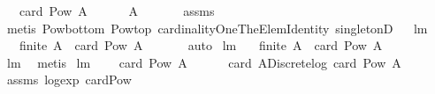 \begin{isabellebody}
\ \ \ {\isachardoublequoteopen}card\ {\isacharparenleft}Pow\ A{\isacharparenright}\ {\isacharequal}\ {}{\isachardoublequoteclose}\ \isanewline
\ \ \ {\isachardoublequoteopen}A\ {\isacharequal}\ {\isacharbraceleft}{\isacharbraceright}{\isachardoublequoteclose}\ \isanewline
%
\isadelimproof
\ \ %
\endisadelimproof
%
\isatagproof
{}\isamarkupfalse%
\ assms\ \isamarkupfalse%
\ {\isacharparenleft}metis\ Pow{\isacharunderscore}bottom\ Pow{\isacharunderscore}top\ cardinalityOneTheElemIdentity\ singletonD{\isacharparenright}%
\endisatagproof
{\isafoldproof}%
%
\isadelimproof
\isanewline
%
\endisadelimproof
\isanewline
\ \isanewline
{}\isamarkupfalse%
\ lm{}{}{}{\isacharcolon}\ \isanewline
\ \ {\isachardoublequoteopen}{\isacharparenleft}{\isasymnot}\ {\isacharparenleft}finite\ A{\isacharparenright}{\isacharparenright}\ {\isacharequal}\ {\isacharparenleft}card\ {\isacharparenleft}Pow\ A{\isacharparenright}\ {\isacharequal}\ {}{\isacharparenright}{\isachardoublequoteclose}\ \isanewline
%
\isadelimproof
\ \ %
\endisadelimproof
%
\isatagproof
{}\isamarkupfalse%
\ auto%
\endisatagproof
{\isafoldproof}%
%
\isadelimproof
\isanewline
%
\endisadelimproof
\isanewline
{}\isamarkupfalse%
\ lm{}{}{}{\isacharcolon}\ \isanewline
\ \ {\isachardoublequoteopen}{\isacharparenleft}finite\ A{\isacharparenright}\ {\isacharequal}\ {\isacharparenleft}card\ {\isacharparenleft}Pow\ A{\isacharparenright}\ {\isasymnoteq}\ {}{\isacharparenright}{\isachardoublequoteclose}\ \isanewline
%
\isadelimproof
\ \ %
\endisadelimproof
%
\isatagproof
{}\isamarkupfalse%
\ lm{}{}{}\ \isamarkupfalse%
\ metis%
\endisatagproof
{\isafoldproof}%
%
\isadelimproof
\isanewline
%
\endisadelimproof
\isanewline
{}\isamarkupfalse%
\ lm{}{}{}{\isacharcolon}\ \isanewline
\ \ \ {\isachardoublequoteopen}card\ {\isacharparenleft}Pow\ A{\isacharparenright}\ {\isasymnoteq}\ {}{\isachardoublequoteclose}\ \isanewline
\ \ \ {\isachardoublequoteopen}card\ A{\isacharequal}Discrete{\isachardot}log\ {\isacharparenleft}card\ {\isacharparenleft}Pow\ A{\isacharparenright}{\isacharparenright}{\isachardoublequoteclose}\ \isanewline
%
\isadelimproof
\ \ %
\endisadelimproof
%
\isatagproof
{}\isamarkupfalse%
\ assms\ log{\isacharunderscore}exp\ card{\isacharunderscore}Pow\ \isamarkupfalse%

\end{isabellebody}
